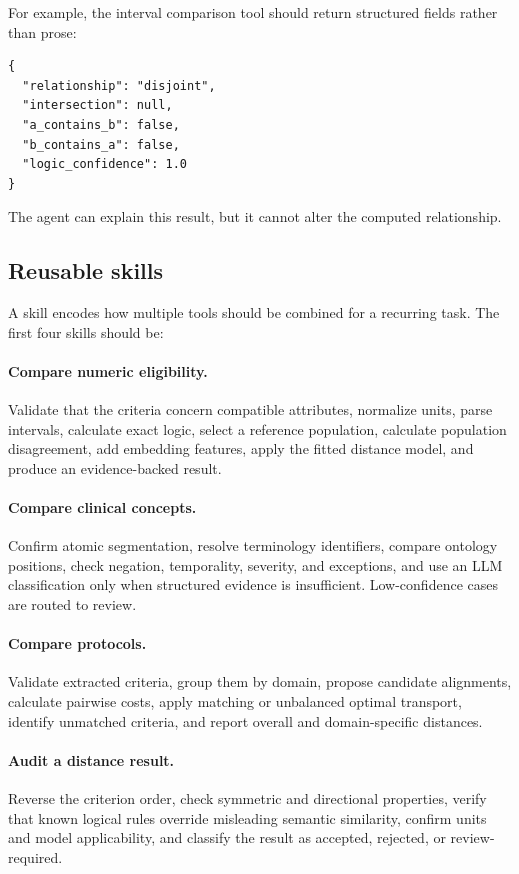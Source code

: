 \documentclass[11pt]{article}
\begin{document}
For example, the interval comparison tool should return structured fields rather than prose:

\begin{verbatim}
{
  "relationship": "disjoint",
  "intersection": null,
  "a_contains_b": false,
  "b_contains_a": false,
  "logic_confidence": 1.0
}
\end{verbatim}

The agent can explain this result, but it cannot alter the computed relationship.

\subsection{Reusable skills}

A skill encodes how multiple tools should be combined for a recurring task. The first four skills should be:

\paragraph{Compare numeric eligibility.}
Validate that the criteria concern compatible attributes, normalize units, parse intervals, calculate exact logic, select a reference population, calculate population disagreement, add embedding features, apply the fitted distance model, and produce an evidence-backed result.

\paragraph{Compare clinical concepts.}
Confirm atomic segmentation, resolve terminology identifiers, compare ontology positions, check negation, temporality, severity, and exceptions, and use an LLM classification only when structured evidence is insufficient. Low-confidence cases are routed to review.

\paragraph{Compare protocols.}
Validate extracted criteria, group them by domain, propose candidate alignments, calculate pairwise costs, apply matching or unbalanced optimal transport, identify unmatched criteria, and report overall and domain-specific distances.

\paragraph{Audit a distance result.}
Reverse the criterion order, check symmetric and directional properties, verify that known logical rules override misleading semantic similarity, confirm units and model applicability, and classify the result as accepted, rejected, or review-required.
\end{document}
